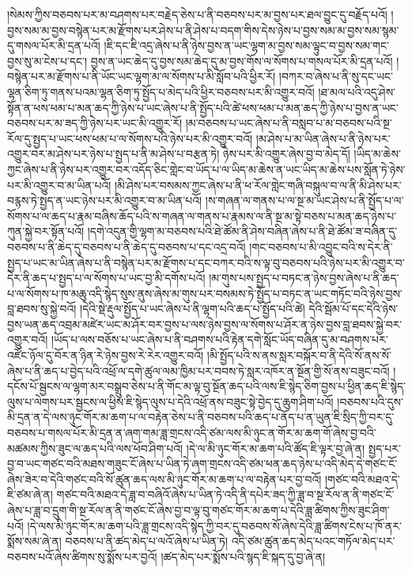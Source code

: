 །སེམས་ཀྱིས་བཅབས་པར་མ་བཤགས་པར་བརྗེད་ཅེས་པ་ནི་བཅབས་པར་མ་བྱས་པར་ཐལ་བྱུང་དུ་བརྗོད་པའོ། །བྱས་སམ་མ་བྱས་བསྙེན་པར་མ་རྫོགས་པར་ཤེས་པ་ནི་ཤེས་པ་བདག་གིས་དེས་ཉེས་པ་བྱས་སམ་མ་བྱས་སམ་སྙམ་དུ་གསལ་པོར་མི་དྲན་པའོ། །ཇི་དང་ཇི་འདྲ་ཞེས་པ་ནི་ཉེས་བྱས་ན་ཡང་ལྷག་མ་བྱས་སམ་ལྟུང་བ་བྱས་སམ་གང་བྱས་སུ་མ་ངེས་པ་དང་། བྱས་ན་ཡང་ཆེད་དུ་བྱས་སམ་ཆེད་དུ་མ་བྱས་གོས་ལ་སོགས་པ་གསལ་པོར་མི་དྲན་པའོ། །བསྙེན་པར་མ་རྫོགས་པ་ནི་ཡོང་ཡང་ལྷག་མ་ལ་སོགས་པ་མི་སློབ་པའི་ཕྱིར་རོ། །བཀར་བ་ཞེས་པ་ནི་སུ་དང་ཡང་ལྷན་ཅིག་ཏུ་གནས་པའམ་ལྷན་ཅིག་ཏུ་སྤྱོད་པ་མེད་པའི་ཕྱིར་བཅབས་པར་མི་འགྱུར་བའོ། །ཐ་མལ་པའི་འདུ་ཤེས་སྟོན་ན་ཕས་ཕམ་པ་མན་ཆད་ཀྱི་ཉེས་པ་ཡང་ཞེས་པ་ནི་སྤྱོད་པའི་ཚེ་ཕས་ཕམ་པ་མན་ཆད་ཀྱི་ཉེས་པ་བྱས་ན་ཡང་བཅབས་པར་མ་ཟད་ཀྱི་ཉེས་པར་ཡང་མི་འགྱུར་རོ། །མ་བཅབས་པ་ཡང་ཞེས་པ་ནི་བསླབ་པ་མ་བཅབས་པའི་སྔ་རོལ་དུ་སྤྱད་པ་ཡང་ཕས་ཕམ་པ་ལ་སོགས་པའི་ཉེས་པར་མི་འགྱུར་བའོ། །མ་ཤེས་པ་མ་ཡིན་ཞེས་པ་ནི་ཉེས་པར་འགྱུར་བར་མ་ཤེས་པར་ཉེས་པ་སྤྱད་པ་ནི་མ་ཤེས་པ་བརྩན་ཏེ། ཉེས་པར་མི་འགྱུར་ཞེས་བྱ་བ་མེད་དོ། །ཡིད་མ་ཆེས་ཀྱང་ཞེས་པ་ནི་ཉེས་པར་འགྱུར་བར་འདོད་ཅིང་གླེང་བ་ཡོད་པ་ལ་ཡིད་མ་ཆེས་ན་ཡང་ཡིད་མ་ཆེས་པས་སློན་ཏེ་ཉེས་པར་མི་འགྱུར་བ་མ་ཡིན་པའོ། །མི་ཤེས་པར་བསམས་ཀྱང་ཞེས་པ་ནི་ཕ་རོལ་གླེང་གཞི་བསྐུལ་བ་ལ་ནི་མི་ཤེས་པར་བརྙས་ཏེ་སྤྱད་ན་ཡང་ཉེས་པར་མི་འགྱུར་བ་མ་ཡིན་པའོ། །ས་གཞན་ལ་གནས་པ་ལ་སྔ་མ་ཡང་ཤེས་པ་ནི་སྤྱོད་པ་ལ་སོགས་པ་ལ་ཆད་པ་རྣམ་བཞིས་ཆོད་པའི་ས་གཞན་ལ་གནས་པ་རྣམས་ལ་ནི་སྔ་མ་སྟེ་བཅས་པ་མན་ཆད་ཉེས་པ་ཀུན་སྐྱེ་བར་སྟོན་པའོ། །དགེ་འདུན་གྱི་ལྷག་མ་བཅབས་པའི་ཐེ་ཚོམ་ནི་ཤེས་བཞིན་ཞེས་པ་ནི་ཐེ་ཚོམ་ཟ་བཞིན་དུ་བཅབས་པ་ནི་ཆེད་དུ་བཅབས་པ་ནི་ཆེད་དུ་བཅབས་པ་དང་འདྲ་བའོ། །གང་བཅབས་པ་མི་འབྱུང་བའི་ས་དེར་ནི་སྤྱད་པ་ཡང་མ་ཡིན་ཞེས་པ་ནི་བསྙེན་པར་མ་རྫོགས་པ་དང་བཀར་བའི་ས་ལྟ་བུ་བཅབས་པའི་ཉེས་པར་མི་འགྱུར་བ་དེར་ནི་ཆད་པ་སྤྱད་པ་ལ་སོགས་པ་ཡང་བྱ་མི་དགོས་པའོ། །མ་གུས་པས་སྤྱད་པ་བཏང་ན་ཉེས་བྱས་ཞེས་པ་ནི་ཆད་པ་ལ་སོགས་པ་ཁ་མཆུ་འདི་སྙེད་སུས་ནུས་ཞེས་མ་གུས་པར་བསམས་ཏེ་སྤྱོད་པ་བཏང་ན་ཡང་གཏོང་བའི་ཉེས་བྱས་བླ་ཐབས་སུ་སྐྱེ་བའོ། །དེའི་སྡེ་རྡུལ་སྤྱོད་པ་ཡང་ཞེས་པ་ནི་ལྷག་པའི་ཆད་པ་སྤྱོད་པའི་ཚེ། དེའི་སྦོམ་པོ་དང་དེའི་ཉེས་བྱས་ཡན་ཆད་འབྲམ་མཛེར་ཡང་མ་ཤོར་བར་བྱས་པ་ལས་ཉེས་བྱས་ལ་སོགས་པ་ཤོར་ན་ཉེས་བྱས་བླ་ཐབས་སྐྱེ་བར་འགྱུར་བའོ། །ཡོད་པ་ལས་བཅོས་པ་ཡང་ཞེས་པ་ནི་བཤགས་པའི་རྟེན་དགེ་སློང་ཡོད་བཞིན་དུ་མ་བཤགས་པར་འཛོང་ཉོལ་དུ་བོར་ན་ཉིན་རེ་ཉེས་བྱས་རེ་རེར་འགྱུར་བའོ། །མི་སྤྱོད་པའི་ས་ནས་སླར་བསྐོར་བ་ནི་དེའི་སོ་ནས་སོ་ཞེས་པ་ནི་ཆད་པ་བྱེད་པའི་འཕྲོ་ལ་དགེ་ཚུལ་ལམ་ཁྱིམ་པར་བབས་ཏེ་སླར་འཁོར་ན་སྔོན་གྱི་སོ་ནས་བཟུང་བའོ། །དངོས་པོ་སྦྱངས་ལ་ལྷག་མར་བསྒྲུབ་ཅེས་པ་ནི་གོང་མ་ལྟ་བུ་སྔོན་ཆད་པའི་ལས་ཇི་སྙེད་ཅིག་བྱས་པ་ཕྱིན་ཆད་ཇི་སྙེད་ལུས་པ་ལེགས་པར་སྦྱངས་ལ་ཕྱིས་ཇི་སྙེད་ལུས་པ་དེའི་འཕྲོ་ནས་བཟུང་སྟེ་བྱེད་དུ་ཆུག་ཤིག་པའོ། །བཅབས་པའི་དུས་མི་དྲན་ན་དེ་ལས་ཉུང་གོར་མ་ཆག་པ་ལ་བརྟེན་ཅེས་པ་ནི་བཅབས་པའི་ཆད་པ་ནོད་པ་ན་ཡུན་ཇི་སྲིད་ཀྱི་བར་དུ་བཅབས་པ་གསལ་པོར་མི་དྲན་ན་ཞག་གམ་ཟླ་གྲངས་འདི་ཙམ་ལས་མི་ཉུང་ན་གོར་མ་ཆག་གོ་ཞེས་བྱ་བའི་མཚམས་ཀྱིས་ཟུང་ལ་ཆད་པའི་ལས་ཕོབ་ཤིག་པའོ། །དེ་ལ་མི་ཉུང་གོར་མ་ཆག་པའི་ཚོད་ཇི་ལྟར་བྱ་ཞེ་ན། སྤྱད་པར་བྱ་བ་ཡང་གཙང་བའི་མཐས་གཟུང་ངོ་ཞེས་པ་ཡིན་ཏེ་ཞག་གྲངས་འདི་ཙམ་ཕན་ཆད་ཉེས་པ་འདི་མེད་དེ་གཙང་ངོ་ཞེས་ཟེར་བ་དེའི་གཙང་བའི་སོ་ཚུན་ཆད་ལས་མི་ཉུང་གོར་མ་ཆག་པ་ལ་བརྟེན་པར་བྱ་བའོ། །གཙང་བའི་མཐའ་དེ་ཇི་ཙམ་ཞེ་ན། གཙང་བའི་མཐའ་དེ་ཟླ་བ་བཞིའོ་ཞེས་པ་ཡིན་ཏེ་འདི་ནི་དཔེར་ཟད་ཀྱི་ཟླ་བ་སྔ་རོལ་ན་ནི་གཙང་ངོ་ཞེས་པ་ཟླ་བ་དྲུག་གི་སྔ་རོལ་ན་ནི་གཙང་ངོ་ཞེས་བྱ་བ་ལྟ་བུ་གཙང་གོར་མ་ཆག་པ་དེའི་ཟླ་ཚིགས་ཀྱིས་ཟུང་ཤིག་པའོ། །དེ་ལས་མི་ཉུང་གོར་མ་ཆག་པའི་ཟླ་གྲངས་འདི་སྙེད་ཀྱི་བར་དུ་བཅབས་སོ་ཞེས་དེའི་ཟླ་ཚིགས་ངེས་པ་ཁོ་ནར་སྨོས་སམ་ཞེ་ན། བཅབས་པ་ནི་ཚད་མེད་པ་ལའོ་ཞེས་པ་ཡིན་ཏེ། འདི་ཙམ་ཚུན་ཆད་མེད་པའང་གཏོལ་མེད་པར་བཅབས་པའོ་ཞེས་ཚིགས་སུ་སྨོས་པར་བྱའོ། །ཚད་མེད་པར་སྨོས་པའི་སྙད་ཇི་སྐད་དུ་བྱ་ཞེ་ན། 